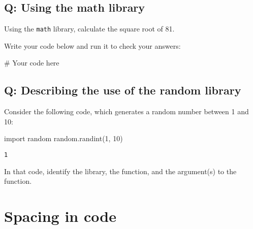 \documentclass[
  letterpaper,
  DIV=11,
  numbers=noendperiod]{scrreprt}
\newenvironment{Shaded}{\begin{snugshade}}{\end{snugshade}}
\newcommand{\CommentTok}[1]{\textcolor[rgb]{0.37,0.37,0.37}{#1}}
\newcommand{\DecValTok}[1]{\textcolor[rgb]{0.68,0.00,0.00}{#1}}
\newcommand{\ImportTok}[1]{\textcolor[rgb]{0.00,0.46,0.62}{#1}}
\newcommand{\NormalTok}[1]{\textcolor[rgb]{0.00,0.23,0.31}{#1}}
\begin{document}
\begin{tcolorbox}[enhanced jigsaw, colframe=quarto-callout-tip-color-frame, opacityback=0, titlerule=0mm, bottomrule=.15mm, breakable, leftrule=.75mm, colbacktitle=quarto-callout-tip-color!10!white, title=\textcolor{quarto-callout-tip-color}{\faLightbulb}\hspace{0.5em}{Practice}, rightrule=.15mm, coltitle=black, opacitybacktitle=0.6, colback=white, left=2mm, arc=.35mm, toptitle=1mm, bottomtitle=1mm, toprule=.15mm]

\subsection{Q: Using the math library}\label{q-using-the-math-library}

Using the \texttt{math} library, calculate the square root of 81.

Write your code below and run it to check your answers:

\begin{Shaded}
\begin{Highlighting}[]
\CommentTok{\# Your code here}
\end{Highlighting}
\end{Shaded}

\subsection{Q: Describing the use of the random
library}\label{q-describing-the-use-of-the-random-library}

Consider the following code, which generates a random number between 1
and 10:

\begin{Shaded}
\begin{Highlighting}[]
\ImportTok{import}\NormalTok{ random}
\NormalTok{random.randint(}\DecValTok{1}\NormalTok{, }\DecValTok{10}\NormalTok{)}
\end{Highlighting}
\end{Shaded}

\begin{verbatim}
1
\end{verbatim}

In that code, identify the library, the function, and the argument(s) to
the function.

\end{tcolorbox}

\section{Spacing in code}\label{spacing-in-code}
\end{document}
